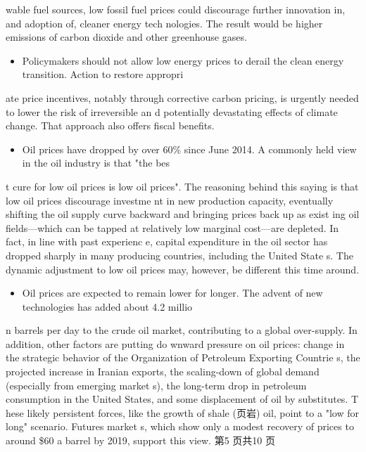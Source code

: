 \documentclass[UTF8,11pt]{ctexart}
\begin{document}
wable fuel sources, low fossil fuel prices could discourage further innovation in, and adoption of, cleaner energy tech nologies. The result would be higher emissions of carbon dioxide and other greenhouse gases.


\begin{itemize}[leftmargin=2em,itemsep=.2em,topsep=.4em]\item[B.] Policymakers should not allow low energy prices to derail the clean energy transition. Action to restore appropri
\end{itemize}

ate price incentives, notably through corrective carbon pricing, is urgently needed to lower the risk of irreversible an d potentially devastating effects of climate change. That approach also offers fiscal benefits.


\begin{itemize}[leftmargin=2em,itemsep=.2em,topsep=.4em]\item[C.] Oil prices have dropped by over 60\% since June 2014. A commonly held view in the oil industry is that "the bes
\end{itemize}

t cure for low oil prices is low oil prices". The reasoning behind this saying is that low oil prices discourage investme nt in new production capacity, eventually shifting the oil supply curve backward and bringing prices back up as exist ing oil fields—which can be tapped at relatively low marginal cost—are depleted. In fact, in line with past experienc e, capital expenditure in the oil sector has dropped sharply in many producing countries, including the United State s. The dynamic adjustment to low oil prices may, however, be different this time around.


\begin{itemize}[leftmargin=2em,itemsep=.2em,topsep=.4em]\item[D.] Oil prices are expected to remain lower for longer. The advent of new technologies has added about 4.2 millio
\end{itemize}

n barrels per day to the crude oil market, contributing to a global over-supply. In addition, other factors are putting do wnward pressure on oil prices: change in the strategic behavior of the Organization of Petroleum Exporting Countrie s, the projected increase in Iranian exports, the scaling-down of global demand (especially from emerging market s), the long-term drop in petroleum consumption in the United States, and some displacement of oil by substitutes. T hese likely persistent forces, like the growth of shale (页岩) oil, point to a "low for long" scenario. Futures market s, which show only a modest recovery of prices to around \$60 a barrel by 2019, support this view. 第5 页共10 页
\end{document}

